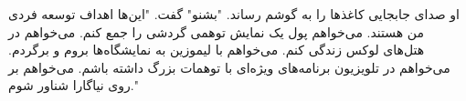 او صدای جابجایی کاغذها را به گوشم رساند. "بشنو" گفت. "این‌ها اهداف توسعه فردی من هستند. می‌خواهم پول یک نمایش توهمی گردشی را جمع کنم. می‌خواهم در هتل‌های لوکس زندگی کنم. می‌خواهم با لیموزین به نمایشگاه‌ها بروم و برگردم. می‌خواهم در تلویزیون برنامه‌های ویژه‌ای با توهمات بزرگ داشته باشم. می‌خواهم بر روی نیاگارا شناور شوم."